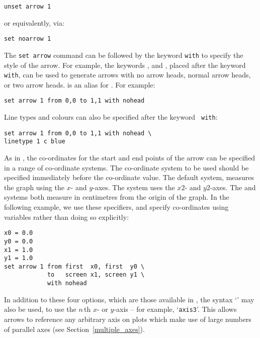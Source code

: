 \begin{verbatim}
unset arrow 1
\end{verbatim}

\noindent or equivalently, via:

\begin{verbatim}
set noarrow 1
\end{verbatim}

The {\tt set arrow} command can be followed by the keyword {\tt with} to
specify the style of the arrow. For example, the keywords ,
 and , placed after the keyword {\tt with}, can
be used to generate arrows with no arrow heads, normal arrow heads, or two
arrow heads.   is an alias for .  For example:

\begin{verbatim}
set arrow 1 from 0,0 to 1,1 with nohead
\end{verbatim}

\noindent Line types and colours can also be specified after the keyword {\tt
with}:

\begin{verbatim}
set arrow 1 from 0,0 to 1,1 with nohead \
linetype 1 c blue
\end{verbatim}

As in \gnuplot, the co-ordinates for the start and end points of the arrow can
be specified in a range of co-ordinate systems. The co-ordinate system to be
used should be specified immediately before the co-ordinate value. The default
system, \indcot{first} measures the graph using the $x$- and $y$-axes. The
\indcot{second} system uses the $x2$- and $y2$-axes. The \indcot{screen} and
\indcot{graph} systems both measure in centimetres from the origin of the
graph. In the following example, we use these specifiers, and specify
co-ordinates using variables rather than doing so explicitly:

\begin{verbatim}
x0 = 0.0
y0 = 0.0
x1 = 1.0
y1 = 1.0
set arrow 1 from first  x0, first  y0 \
            to   screen x1, screen y1 \
            with nohead
\end{verbatim}

In addition to these four options, which are those available in \gnuplot, the
syntax `' may also be used, to use the $n\,$th $x$- or
$y$-axis -- for example, `{\tt axis3}'. This allows arrows to
reference any arbitrary axis on plots which make use of large numbers of
parallel axes (see Section~\ref{multiple_axes}).

